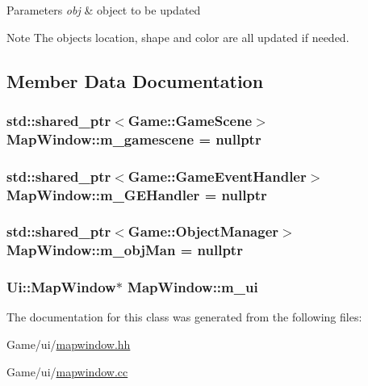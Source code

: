 \begin{DoxyParams}{Parameters}
{\em obj} & object to be updated \\
\hline
\end{DoxyParams}
\begin{DoxyNote}{Note}
The objects location, shape and color are all updated if needed. 
\end{DoxyNote}


\subsection{Member Data Documentation}
\hypertarget{classMapWindow_ac4f4278e13ff117ea6556db4ddc46dde}{
\subsubsection[{m\-\_\-gamescene}]{\setlength{\rightskip}{0pt plus 5cm}std\-::shared\-\_\-ptr$<${\bf Game\-::\-Game\-Scene}$>$ Map\-Window\-::m\-\_\-gamescene = nullptr\hspace{0.3cm}{\ttfamily [private]}}}\label{classMapWindow_ac4f4278e13ff117ea6556db4ddc46dde}
\hypertarget{classMapWindow_aff9ec655fd7cd6bfcdb32e84d95e9311}{
\subsubsection[{m\-\_\-\-G\-E\-Handler}]{\setlength{\rightskip}{0pt plus 5cm}std\-::shared\-\_\-ptr$<${\bf Game\-::\-Game\-Event\-Handler}$>$ Map\-Window\-::m\-\_\-\-G\-E\-Handler = nullptr\hspace{0.3cm}{\ttfamily [private]}}}\label{classMapWindow_aff9ec655fd7cd6bfcdb32e84d95e9311}
\hypertarget{classMapWindow_a70651ccf16095da5e1498179a307db75}{
\subsubsection[{m\-\_\-obj\-Man}]{\setlength{\rightskip}{0pt plus 5cm}std\-::shared\-\_\-ptr$<${\bf Game\-::\-Object\-Manager}$>$ Map\-Window\-::m\-\_\-obj\-Man = nullptr\hspace{0.3cm}{\ttfamily [private]}}}\label{classMapWindow_a70651ccf16095da5e1498179a307db75}
\hypertarget{classMapWindow_a35e4450acb2c374ad72473e8bf60aaf8}{
\subsubsection[{m\-\_\-ui}]{\setlength{\rightskip}{0pt plus 5cm}Ui\-::\-Map\-Window$\ast$ Map\-Window\-::m\-\_\-ui\hspace{0.3cm}{\ttfamily [private]}}}\label{classMapWindow_a35e4450acb2c374ad72473e8bf60aaf8}


The documentation for this class was generated from the following files\-:\begin{DoxyCompactItemize}
\item 
Game/ui/\hyperlink{mapwindow_8hh}{mapwindow.\-hh}\item 
Game/ui/\hyperlink{mapwindow_8cc}{mapwindow.\-cc}\end{DoxyCompactItemize}
